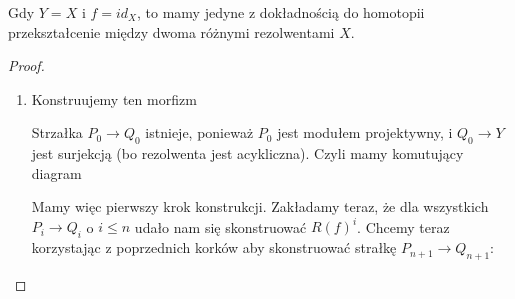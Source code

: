 \begin{conclusion}
  Gdy $Y=X$ i $f=id_X$, to mamy jedyne z dokładnością do homotopii przekształcenie między dwoma różnymi rezolwentami $X$.

  \begin{center}\end{center}
\end{conclusion}

\begin{proof}
  \begin{enumerate}[label=(\alph*)]
    \item Konstruujemy ten morfizm 
      \begin{center}\end{center}
      Strzałka $P_0\to Q_0$ istnieje, ponieważ $P_0$ jest modułem projektywny, i $Q_0\to Y$ jest surjekcją (bo rezolwenta jest acykliczna). Czyli mamy komutujący diagram
      \begin{center}\end{center}
      {\color{red}

  Mamy więc pierwszy krok konstrukcji. Zakładamy teraz, że dla wszystkich $P_i\to Q_i$ o $i\leq n$ udało nam się skonstruować $R(f)^i$. Chcemy teraz korzystając z poprzednich korków aby skonstruować strałkę $P_{n+1}\to Q_{n+1}$:
  \begin{center}\end{center}

}
\end{enumerate}
\end{proof}
